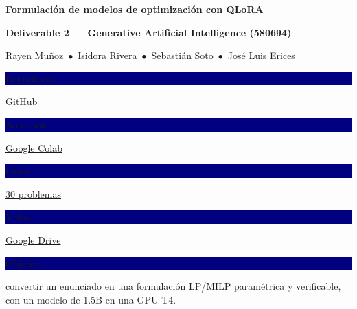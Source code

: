 \documentclass[8pt,a4paper]{extarticle}
\newcommand{\badge}[1]{\colorbox{navy}{\color{white}\bfseries\footnotesize\strut #1}}
\begin{document}
\begin{center}
{\color{navy}\fontsize{15}{18}\selectfont\bfseries Formulación de modelos de optimización con QLoRA}\par\vspace{2pt}
{\color{headblue}\bfseries Deliverable 2 --- Generative Artificial Intelligence (580694)}\par\vspace{1pt}
{\small Rayen Muñoz \,$\bullet$\, Isidora Rivera \,$\bullet$\, Sebastián Soto \,$\bullet$\, José Luis Erices}\par\vspace{4pt}
\badge{Repositorio} \href{https://github.com/Jose21531/GenAI-Optimization}{\small GitHub}\quad
\badge{Notebook} \href{https://colab.research.google.com/github/Jose21531/GenAI-Optimization/blob/main/Deliverable\%202/Deliverable_2.ipynb}{\small Google Colab}\quad
\badge{Casos} \href{https://github.com/Jose21531/GenAI-Optimization/blob/main/Deliverable\%202/casos_benchmark.md}{\small 30 problemas}\quad
\badge{Video} \href{https://drive.google.com/drive/folders/1NwKmSSmr4_v8Gd-W1X92eswox6rcSRxV?usp=sharing}{\small Google Drive}\quad
\par\vspace{2pt}\badge{Objetivo} {\small convertir un enunciado en una formulación LP/MILP paramétrica y verificable, con un modelo de 1.5B en una GPU T4.}
\end{center}
\vspace{-3pt}
\end{document}
